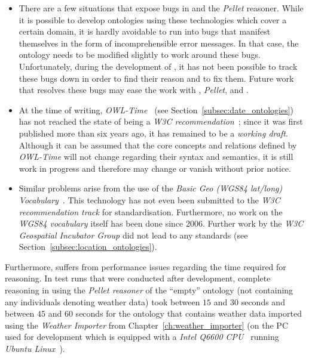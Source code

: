 \begin{itemize}
  \item There are a few situations that expose bugs in \protege and the \emph{Pellet} reasoner. While it is possible to develop ontologies using these technologies which cover a certain domain, it is hardly avoidable to run into bugs that manifest themselves in the form of incomprehensible error messages. In that case, the ontology needs to be modified slightly to work around these bugs. Unfortunately, during the development of \smarthomeweather, it has not been possible to track these bugs down in order to find their reason and to fix them. Future work that resolves these bugs may ease the work with \protege, \emph{Pellet}, and \smarthomeweather.
  
  \item At the time of writing, \emph{OWL-Time}~\cite{owl-time} (see Section~\ref{subsec:date_ontologies}) has not reached the state of being a \emph{\acs{W3C} recommendation}~\cite{w3c-process}; since it was first published more than six years ago, it has remained to be a \emph{working draft}. Although it can be assumed that the core concepts and relations defined by \emph{OWL-Time} will not change regarding their syntax and semantics, it is still work in progress and therefore may change or vanish without prior notice.
  
  \item Similar problems arise from the use of the \emph{Basic Geo (\acs{WGS84} lat/long) Vocabulary}~\cite{wgs84_vocabulary}. This technology has not even been submitted to the \emph{\acs{W3C} recommendation track} for standardisation. Furthermore, no work on the \emph{\acs{WGS84} vocabulary} itself has been done since 2006. Further work by the \emph{\acs{W3C} Geospatial Incubator Group} did not lead to any standards (see Section~\ref{subsec:location_ontologies}).
\end{itemize}

Furthermore, \smarthomeweather suffers from performance issues regarding the time required for reasoning. In test runs that were conducted after development, complete reasoning in \protege using the \emph{Pellet reasoner} of the ``empty'' ontology (not containing any individuals denoting weather data) took between $15$ and $30$ seconds and between $45$ and $60$ seconds for the ontology that contains weather data imported using the \emph{Weather Importer} from Chapter~\ref{ch:weather_importer} (on the PC used for development which is equipped with a \emph{Intel Q6600 CPU}~\cite{intel_q6600} running \emph{Ubuntu Linux}~\cite{ubuntu}).

